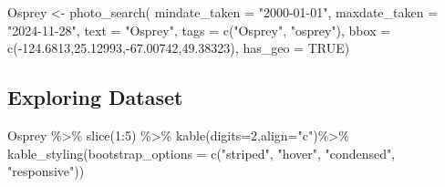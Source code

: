 \documentclass[
  letterpaper,
  DIV=11,
  numbers=noendperiod]{scrartcl}
\newenvironment{Shaded}{\begin{snugshade}}{\end{snugshade}}
\newcommand{\AttributeTok}[1]{\textcolor[rgb]{0.40,0.45,0.13}{#1}}
\newcommand{\ConstantTok}[1]{\textcolor[rgb]{0.56,0.35,0.01}{#1}}
\newcommand{\DecValTok}[1]{\textcolor[rgb]{0.68,0.00,0.00}{#1}}
\newcommand{\FloatTok}[1]{\textcolor[rgb]{0.68,0.00,0.00}{#1}}
\newcommand{\FunctionTok}[1]{\textcolor[rgb]{0.28,0.35,0.67}{#1}}
\newcommand{\NormalTok}[1]{\textcolor[rgb]{0.00,0.23,0.31}{#1}}
\newcommand{\OtherTok}[1]{\textcolor[rgb]{0.00,0.23,0.31}{#1}}
\newcommand{\SpecialCharTok}[1]{\textcolor[rgb]{0.37,0.37,0.37}{#1}}
\newcommand{\StringTok}[1]{\textcolor[rgb]{0.13,0.47,0.30}{#1}}
\begin{document}
\begin{Shaded}
\begin{Highlighting}[]
\NormalTok{Osprey }\OtherTok{\textless{}{-}} \FunctionTok{photo\_search}\NormalTok{(}
  \AttributeTok{mindate\_taken =} \StringTok{"2000{-}01{-}01"}\NormalTok{,}
  \AttributeTok{maxdate\_taken =} \StringTok{"2024{-}11{-}28"}\NormalTok{, }
  \AttributeTok{text =} \StringTok{"Osprey"}\NormalTok{,}
  \AttributeTok{tags =} \FunctionTok{c}\NormalTok{(}\StringTok{"Osprey"}\NormalTok{, }\StringTok{"osprey"}\NormalTok{),}
  \AttributeTok{bbox =} \FunctionTok{c}\NormalTok{(}\SpecialCharTok{{-}}\FloatTok{124.6813}\NormalTok{,}\FloatTok{25.12993}\NormalTok{,}\SpecialCharTok{{-}}\FloatTok{67.00742}\NormalTok{,}\FloatTok{49.38323}\NormalTok{),}
  \AttributeTok{has\_geo =} \ConstantTok{TRUE}\NormalTok{)}
\end{Highlighting}
\end{Shaded}

\subsection{Exploring Dataset}\label{exploring-dataset}

\begin{Shaded}
\begin{Highlighting}[]
\NormalTok{Osprey }\SpecialCharTok{\%\textgreater{}\%} 
  \FunctionTok{slice}\NormalTok{(}\DecValTok{1}\SpecialCharTok{:}\DecValTok{5}\NormalTok{) }\SpecialCharTok{\%\textgreater{}\%} 
  \FunctionTok{kable}\NormalTok{(}\AttributeTok{digits=}\DecValTok{2}\NormalTok{,}\AttributeTok{align=}\StringTok{"c"}\NormalTok{)}\SpecialCharTok{\%\textgreater{}\%} 
  \FunctionTok{kable\_styling}\NormalTok{(}\AttributeTok{bootstrap\_options =} 
                  \FunctionTok{c}\NormalTok{(}\StringTok{"striped"}\NormalTok{, }\StringTok{"hover"}\NormalTok{, }\StringTok{"condensed"}\NormalTok{, }\StringTok{"responsive"}\NormalTok{))}
\end{Highlighting}
\end{Shaded}
\end{document}
